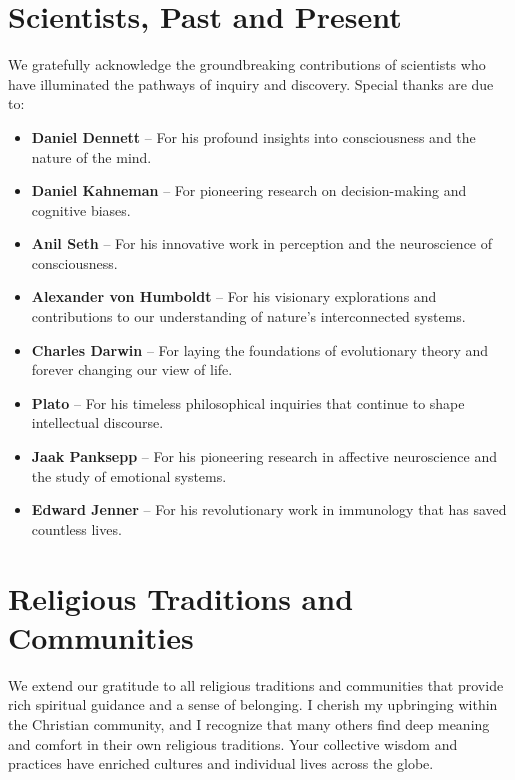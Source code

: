 \documentclass[12pt,openany]{book}
\begin{document}
\section*{Scientists, Past and Present}
We gratefully acknowledge the groundbreaking contributions of scientists who have illuminated the pathways of inquiry and discovery. Special thanks are due to:
\begin{itemize}
    \item \textbf{Daniel Dennett} – For his profound insights into consciousness and the nature of the mind.
    \item \textbf{Daniel Kahneman} – For pioneering research on decision-making and cognitive biases.
    \item \textbf{Anil Seth} – For his innovative work in perception and the neuroscience of consciousness.
    \item \textbf{Alexander von Humboldt} – For his visionary explorations and contributions to our understanding of nature’s interconnected systems.
    \item \textbf{Charles Darwin} – For laying the foundations of evolutionary theory and forever changing our view of life.
    \item \textbf{Plato} – For his timeless philosophical inquiries that continue to shape intellectual discourse.
    \item \textbf{Jaak Panksepp} – For his pioneering research in affective neuroscience and the study of emotional systems.
    \item \textbf{Edward Jenner} – For his revolutionary work in immunology that has saved countless lives.
\end{itemize}

\section*{Religious Traditions and Communities}
We extend our gratitude to all religious traditions and communities that provide rich spiritual guidance and a sense of belonging. I cherish my upbringing within the Christian community, and I recognize that many others find deep meaning and comfort in their own religious traditions. Your collective wisdom and practices have enriched cultures and individual lives across the globe.
\end{document}
